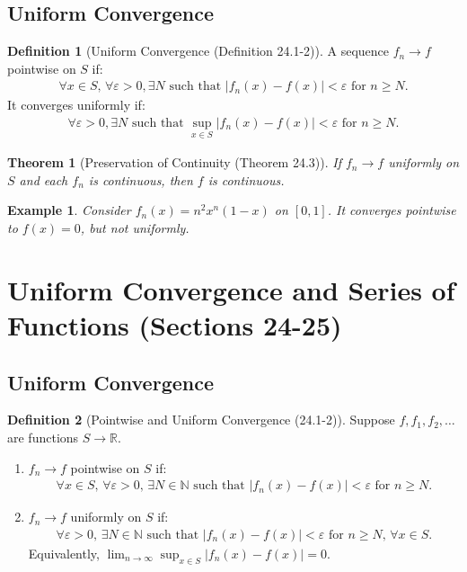 \documentclass[9pt]{article}
\theoremstyle{definition}
\newtheorem{definition}{Definition}
\theoremstyle{plain}
\newtheorem{theorem}{Theorem}
\newtheorem{example}{Example}
\begin{document}
\subsection*{Uniform Convergence}
\begin{definition}[Uniform Convergence (Definition 24.1-2)]
A sequence $ f_n \to f $ pointwise on $ S $ if:
\begin{align}
\forall x \in S, \, \forall \varepsilon > 0, \exists N \text{ such that } |f_n(x) - f(x)| < \varepsilon \text{ for } n \geq N.
\end{align}
It converges uniformly if:
\begin{align}
\forall \varepsilon > 0, \exists N \text{ such that } \sup_{x \in S} |f_n(x) - f(x)| < \varepsilon \text{ for } n \geq N.
\end{align}
\end{definition}

\begin{theorem}[Preservation of Continuity (Theorem 24.3)]
If $ f_n \to f $ uniformly on $ S $ and each $ f_n $ is continuous, then $ f $ is continuous.
\end{theorem}

\begin{example}
Consider $ f_n(x) = n^2 x^n (1-x) $ on $ [0, 1] $. It converges pointwise to $ f(x) = 0 $, but not uniformly.
\end{example}
\section*{Uniform Convergence and Series of Functions (Sections 24-25)}

\subsection*{Uniform Convergence}
\begin{definition}[Pointwise and Uniform Convergence (24.1-2)]
Suppose $ f, f_1, f_2, \ldots $ are functions $ S \to \mathbb{R} $.
\begin{enumerate}
    \item $ f_n \to f $ pointwise on $ S $ if:
    \begin{align}
    \forall x \in S, \, \forall \varepsilon > 0, \, \exists N \in \mathbb{N} \text{ such that } |f_n(x) - f(x)| < \varepsilon \text{ for } n \geq N.
    \end{align}
    \item $ f_n \to f $ uniformly on $ S $ if:
    \begin{align}
    \forall \varepsilon > 0, \, \exists N \in \mathbb{N} \text{ such that } |f_n(x) - f(x)| < \varepsilon \text{ for } n \geq N, \, \forall x \in S.
    \end{align}
    Equivalently, $ \lim_{n \to \infty} \sup_{x \in S} |f_n(x) - f(x)| = 0 $.
\end{enumerate}
\end{definition}
\end{document}
